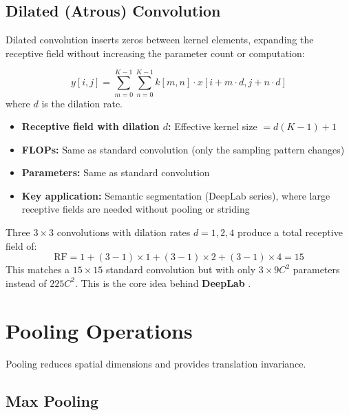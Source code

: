 \subsection{Dilated (Atrous) Convolution}

Dilated convolution inserts zeros between kernel elements, expanding the receptive field without increasing the parameter count or computation:

\begin{equation}
y[i,j] = \sum_{m=0}^{K-1}\sum_{n=0}^{K-1} k[m,n] \cdot x[i + m \cdot d, j + n \cdot d]
\end{equation}
where $d$ is the dilation rate.

\begin{properties}
\begin{itemize}
    \item \textbf{Receptive field with dilation $d$:} Effective kernel size $= d(K - 1) + 1$
    \item \textbf{FLOPs:} Same as standard convolution (only the sampling pattern changes)
    \item \textbf{Parameters:} Same as standard convolution
    \item \textbf{Key application:} Semantic segmentation (DeepLab series), where large receptive fields are needed without pooling or striding
\end{itemize}
\end{properties}

\begin{example}
Three $3 \times 3$ convolutions with dilation rates $d = 1, 2, 4$ produce a total receptive field of:
\begin{equation}
\text{RF} = 1 + (3-1)\times1 + (3-1)\times2 + (3-1)\times4 = 15
\end{equation}
This matches a $15 \times 15$ standard convolution but with only $3 \times 9C^2$ parameters instead of $225C^2$. This is the core idea behind \textbf{DeepLab} \cite{chen2017deeplab}.
\end{example}

\section{Pooling Operations}

Pooling reduces spatial dimensions and provides translation invariance.

\subsection{Max Pooling}

